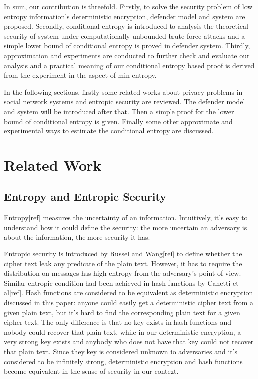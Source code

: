 \documentclass[10pt,a4paper]{article}
\begin{document}
	In sum, our contribution is threefold. Firstly, to solve the security problem
	of low entropy information's deterministic encryption, defender model and system
	are proposed. Secondly, conditional entropy is introduced to analysis
	the theoretical security of system under computationally-unbounded brute force
	attacks and a simple lower bound of conditional entropy is proved in defender system. 
	Thirdly, approximation and experiments
	are conducted to further check and evaluate our analysis and a practical meaning
	of our conditional entropy based proof is derived from the experiment 
	in the aspect of min-entropy.
	
	In the following sections, firstly some related works
	about privacy problems in social network systems and
	entropic security are reviewed. The defender model and system will be
	introduced after that. Then a simple proof for the lower bound of conditional entropy
	is given. Finally some other approximate and experimental ways to estimate the conditional
	entropy are discussed.
	
\section{Related Work}	\label{sec_rw}
	\subsection{Entropy and Entropic Security}
	Entropy[ref] measures the uncertainty of an information. Intuitively, it's easy to
	understand how it could define the security: the more uncertain an adversary
	is about the information, the more security it has.
	
	Entropic security is introduced by Russel and Wang[ref] to define
	whether the cipher text leak any predicate of the plain text. However,
	it has to require the distribution on messages has high entropy from
	the adversary's point of view. Similar entropic condition had been
	achieved in hash functions by Canetti et al[ref]. Hash functions are
	considered to be equivalent as deterministic encryption discussed in this
	paper: anyone could easily get a deterministic cipher text from a
	given plain text, but it's hard to find the corresponding plain text
	for a given cipher text. The only difference is that no key exists in
	hash functions and nobody could recover that plain text, while in our deterministic
	encryption, a very strong key exists and anybody who does not have that key
	could not recover that plain text. Since they key is considered unknown to adversaries 
	and	it's considered to be infinitely strong, deterministic encryption and hash functions become
	equivalent in the sense of security in our context.
	
\end{document}
